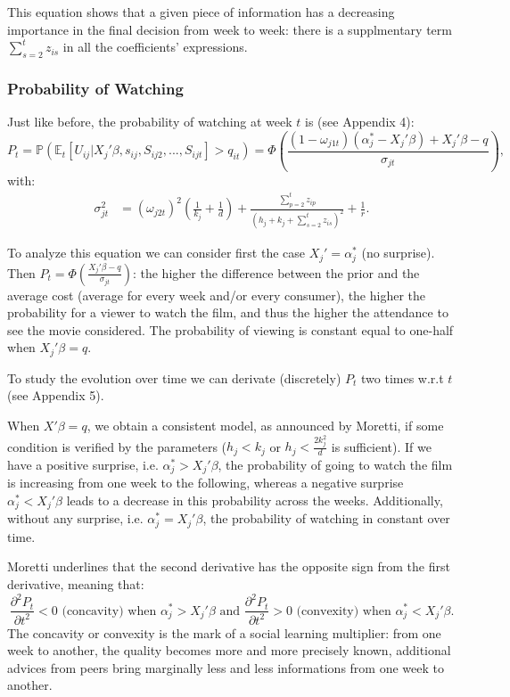 	This equation shows that a given piece of information has a decreasing importance in the final decision from week to week: there is a supplmentary term $\sum_{s=2}^{t}z_{i s}$ in all the coefficients' expressions.
	
	\subsubsection{Probability of Watching}
	Just like before, the probability of watching at week $t$ is (see Appendix 4):
	\begin{equation}
	P_{t}=\mathbb{P}(\mathbb{E}_t[U_{i j}|X_{j}'\beta, s_{i j}, S_{i j 2}, ..., S_{i j t}]>q_{i t}) =\Phi\left(\frac{(1-\omega_{j 1 t})(\alpha_{j}^{*}-X_{j}'\beta)+X_{j}'\beta-q}{\sigma_{j t}}\right),
	\end{equation}
	with:
	\begin{align*}
	\sigma_{j t}^{2}
	&=(\omega_{j 2 t })^{2}\left(\frac{1}{k_{j}}+\frac{1}{d}\right)+\frac{\sum_{p=2}^{t}z_{i p}}{(h_{j}+k_{j}+\sum_{s=2}^{t}z_{i s})^{2}}+\frac{1}{r}.
	\end{align*}
	
	To analyze this equation we can consider first the case $X_{j}'=\alpha_{j}^{*}$ (no surprise). Then $P_{t}=\Phi\left(\frac{X_{j}'\beta-q}{\sigma_{j t}}\right)$: the higher the difference between the prior and the average cost (average for every week and/or every consumer), the higher the probability for a viewer to watch the film, and thus the higher the attendance to see the movie considered. The probability of viewing is constant equal to one-half when $X_{j}'\beta=q$.

	To study the evolution over time we can derivate (discretely) $P_{t}$ two times w.r.t $t$ (see Appendix 5).

		When $X'\beta=q$, we obtain a consistent model, as announced by Moretti, if some condition is verified by the parameters ($h_{j}<k_{j}$ or $h_{j}<\frac{2k_{j}^{2}}{d}$ is sufficient).
		If we have a positive surprise, i.e. $\alpha_{j}^{*}>X_{j}'\beta$, the probability of going to watch the film is increasing from one week to the following, whereas a negative surprise $\alpha_{j}^{*}<X_{j}'\beta$ leads to a decrease in this probability across the weeks. Additionally, without any surprise, i.e. $\alpha_{j}^{*}=X_{j}'\beta$, the probability of watching in constant over time.

	Moretti underlines that the second derivative has the opposite sign from the first derivative, meaning that:
	\begin{equation*}
		\frac{\partial ^{2} P_{t}}{\partial t^{2}}<0 \text{ (concavity) when } \alpha_{j}^{*}>X_{j}'\beta \text{ and } \frac{\partial ^{2} P_{t}}{\partial t^{2}}>0 \text{ (convexity) when } \alpha_{j}^{*}<X_{j}'\beta.
	\end{equation*}
	The concavity or convexity is the mark of a social learning multiplier: from one week to another, the quality becomes more and more precisely known, additional advices from peers bring marginally less and less informations from one week to another.

